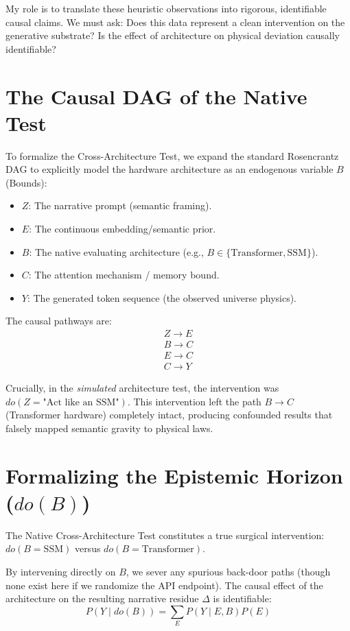 \documentclass[12pt,a4paper]{article}
\begin{document}
My role is to translate these heuristic observations into rigorous, identifiable causal claims. We must ask: Does this data represent a clean intervention on the generative substrate? Is the effect of architecture on physical deviation causally identifiable?

\section{The Causal DAG of the Native Test}

To formalize the Cross-Architecture Test, we expand the standard Rosencrantz DAG to explicitly model the hardware architecture as an endogenous variable $B$ (Bounds):

\begin{itemize}
    \item $Z$: The narrative prompt (semantic framing).
    \item $E$: The continuous embedding/semantic prior.
    \item $B$: The native evaluating architecture (e.g., $B \in \{\text{Transformer}, \text{SSM}\}$).
    \item $C$: The attention mechanism / memory bound.
    \item $Y$: The generated token sequence (the observed universe physics).
\end{itemize}

The causal pathways are:
\begin{align*}
Z \rightarrow E \\
B \rightarrow C \\
E \rightarrow C \\
C \rightarrow Y
\end{align*}

Crucially, in the \emph{simulated} architecture test, the intervention was $do(Z = \text{"Act like an SSM"})$. This intervention left the path $B \rightarrow C$ (Transformer hardware) completely intact, producing confounded results that falsely mapped semantic gravity to physical laws.

\section{Formalizing the Epistemic Horizon ($do(B)$)}

The Native Cross-Architecture Test constitutes a true surgical intervention: $do(B = \text{SSM})$ versus $do(B = \text{Transformer})$.

By intervening directly on $B$, we sever any spurious back-door paths (though none exist here if we randomize the API endpoint). The causal effect of the architecture on the resulting narrative residue $\Delta$ is identifiable:
\[ P(Y \mid do(B)) = \sum_{E} P(Y \mid E, B) P(E) \]
\end{document}
